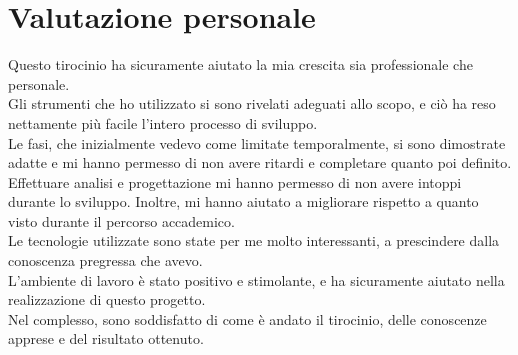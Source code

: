 \section{Valutazione personale}
Questo tirocinio ha sicuramente aiutato la mia crescita sia professionale che personale.\\
Gli strumenti che ho utilizzato si sono rivelati adeguati allo scopo, e ciò ha reso nettamente più facile l'intero processo di sviluppo.\\
Le fasi, che inizialmente vedevo come limitate temporalmente, si sono dimostrate adatte e mi hanno permesso di non avere ritardi e completare quanto poi definito.\\
Effettuare analisi e progettazione mi hanno permesso di non avere intoppi durante lo sviluppo. Inoltre, mi hanno aiutato a migliorare rispetto a quanto visto durante il percorso accademico.\\
Le tecnologie utilizzate sono state per me molto interessanti, a prescindere dalla conoscenza pregressa che avevo.\\
L'ambiente di lavoro è stato positivo e stimolante, e ha sicuramente aiutato nella realizzazione di questo progetto.\\
Nel complesso, sono soddisfatto di come è andato il tirocinio, delle conoscenze apprese e del risultato ottenuto. 